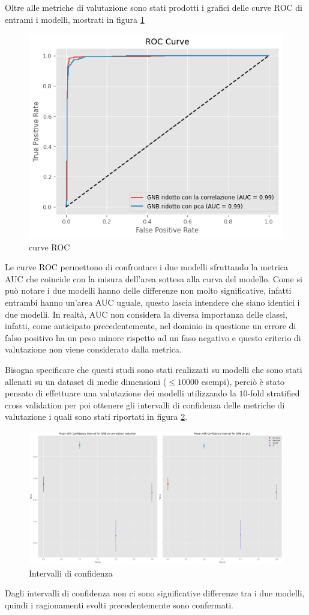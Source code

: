 Oltre alle metriche di valutazione sono stati prodotti i grafici delle curve ROC
di entrami i modelli, mostrati in figura \ref{fig:curve_roc}

\begin{figure}[!ht]
    \centering
    \includegraphics[width=.7\textwidth]{img/gnb/roc_curve.png}
    \caption{curve ROC}
    \label{fig:curve_roc}
\end{figure}

Le curve ROC permettono di confrontare i due modelli sfruttando la metrica AUC
che coincide con la misura dell'area sottesa alla curva del modello.
Come si può notare i due modelli hanno delle differenze non molto significative,
infatti entrambi hanno un'area AUC uguale, questo lascia intendere che siano
identici i due modelli. In realtà, AUC non considera la diversa importanza delle
classi, infatti, come anticipato precedentemente, nel dominio in questione un errore
di falso positivo ha un peso minore rispetto ad un faso negativo e questo criterio
di valutazione non viene considerato dalla metrica.

Bisogna specificare che questi studi sono stati realizzati su modelli che sono stati
allenati su un dataset di medie dimensioni ($\leq 10000$ esempi), perciò è stato
pensato di effettuare una valutazione dei modelli utilizzando la $10$-fold
stratified cross validation per poi ottenere gli intervalli di confidenza delle
metriche di valutazione i quali sono stati riportati in figura \ref{fig:intervalli_confidenza}.

\begin{figure}[!ht]
    \centering
    \includegraphics[width=\textwidth]{img/gnb/intervalli_confidenza.png}
    \caption{Intervalli di confidenza}
    \label{fig:intervalli_confidenza}
\end{figure}

Dagli intervalli di confidenza non ci sono significative differenze tra i due modelli,
quindi i ragionamenti svolti precedentemente sono confermati.